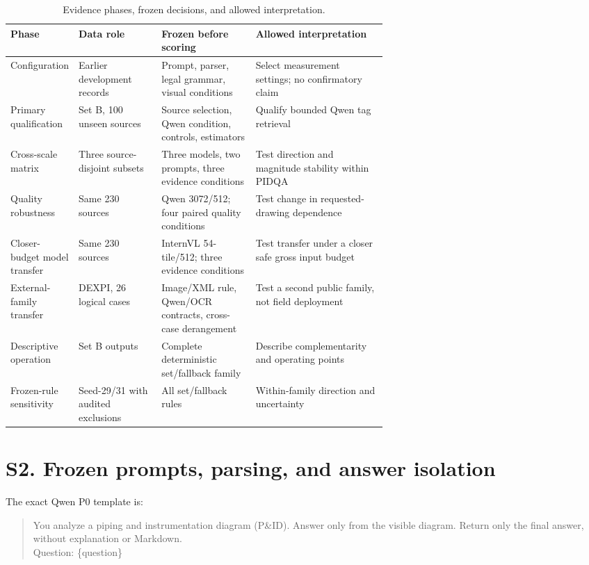 \documentclass[11pt]{article}
\begin{document}
\begin{table}[H]
\centering
\caption{Evidence phases, frozen decisions, and allowed interpretation.}
\label{tab:s1_phases}
\scriptsize
\begin{tabularx}{\linewidth}{P{0.16\linewidth}P{0.22\linewidth}P{0.25\linewidth}Y}
\toprule
Phase & Data role & Frozen before scoring & Allowed interpretation \\
\midrule
Configuration & Earlier development records & Prompt, parser, legal grammar, visual conditions & Select measurement settings; no confirmatory claim \\
Primary qualification & Set B, 100 unseen sources & Source selection, Qwen condition, controls, estimators & Qualify bounded Qwen tag retrieval \\
Cross-scale matrix & Three source-disjoint subsets & Three models, two prompts, three evidence conditions & Test direction and magnitude stability within PIDQA \\
Quality robustness & Same 230 sources & Qwen 3072/512; four paired quality conditions & Test change in requested-drawing dependence \\
Closer-budget model transfer & Same 230 sources & InternVL 54-tile/512; three evidence conditions & Test transfer under a closer safe gross input budget \\
External-family transfer & DEXPI, 26 logical cases & Image/XML rule, Qwen/OCR contracts, cross-case derangement & Test a second public family, not field deployment \\
Descriptive operation & Set B outputs & Complete deterministic set/fallback family & Describe complementarity and operating points \\
Frozen-rule sensitivity & Seed-29/31 with audited exclusions & All set/fallback rules & Within-family direction and uncertainty \\
\bottomrule
\end{tabularx}
\end{table}

\section*{S2. Frozen prompts, parsing, and answer isolation}

The exact Qwen P0 template is:

\begin{quote}\small\ttfamily\raggedright
You analyze a piping and instrumentation diagram (P\&ID). Answer only from the
visible diagram. Return only the final answer, without explanation or
Markdown.\\[2pt]
Question: \{question\}
\end{quote}
\end{document}
